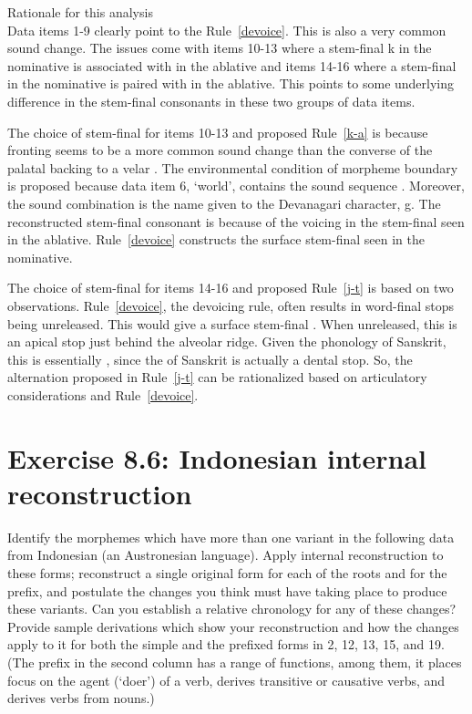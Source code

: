 \documentclass[12pt]{article}
\begin{document}
Rationale for this analysis \\
Data items 1-9 clearly point to the Rule~\ref{devoice}. This is also a very common sound change. The issues come with items 10-13 where a stem-final k in the nominative is associated with  in the ablative and items 14-16 where a stem-final  in the nominative is paired with  in the ablative. This points to some underlying difference in the stem-final consonants in these two groups of data items.

The choice of stem-final  for items 10-13 and proposed Rule~\ref{k-a} is because fronting seems to be a more common sound change than the converse of the palatal  backing to a velar . The environmental condition of morpheme boundary is proposed because data item 6,  `world', contains the sound sequence . Moreover, the sound combination  is the name given to the Devanagari character, {\dn g}. The reconstructed stem-final consonant is  because of the voicing in the stem-final  seen in the ablative. Rule~\ref{devoice} constructs the surface stem-final  seen in the nominative.

The choice of stem-final  for items 14-16 and proposed Rule~\ref{j-t} is based on two observations. Rule~\ref{devoice}, the devoicing rule, often results in word-final stops being unreleased. This would give a surface stem-final . When unreleased, this is an apical stop just behind the alveolar ridge. Given the phonology of Sanskrit, this is essentially , since the  of Sanskrit is actually a dental stop. So, the alternation proposed in Rule~\ref{j-t} can be rationalized based on articulatory considerations and Rule~\ref{devoice}.

\section{Exercise 8.6: Indonesian internal reconstruction}

Identify the morphemes which have more than one variant in the following data from Indonesian (an Austronesian language). Apply internal reconstruction to these forms; reconstruct a single original form for each of the roots and for the prefix, and postulate the changes you think must have taking place to produce these variants. Can you establish a relative chronology for any of these changes? Provide sample derivations which show your reconstruction and how the changes apply to it for both the simple and the prefixed forms in 2, 12, 13, 15, and 19. (The prefix in the second column has a range of functions, among them, it places focus on the agent (`doer') of a verb, derives transitive or causative verbs, and derives verbs from nouns.) \\
\end{document}
